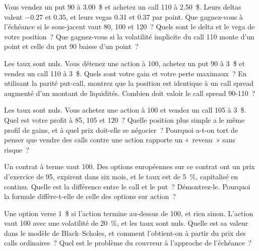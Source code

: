\begin{question}\label{iq:iv2:options-parity-and-greeks:27}
Vous vendez un put 90 à 3.00~\$ et achetez un call 110 à 2.50~\$. Leurs deltas valent $-0.27$ et $0.35$, et leurs vegas 0.31 et 0.37 par point. Que gagnez-vous à l'échéance si le sous-jacent vaut 80, 100 et 120~? Quels sont le delta et le vega de votre position~? Que gagnez-vous si la volatilité implicite du call 110 monte d'un point et celle du put 90 baisse d'un point~?
\end{question}

\begin{question}\label{iq:iv2:options-parity-and-greeks:28}
Les taux sont nuls. Vous détenez une action à 100, achetez un put 90 à 3~\$ et vendez un call 110 à 3~\$. Quels sont votre gain et votre perte maximaux~? En utilisant la parité put-call, montrez que la position est identique à un call spread augmenté d'un montant de liquidités. Combien doit valoir le call spread 90-110~?
\end{question}

\begin{question}\label{iq:iv2:options-parity-and-greeks:29}
Les taux sont nuls. Vous achetez une action à 100 et vendez un call 105 à 3~\$. Quel est votre profit à 85, 105 et 120~? Quelle position plus simple a le même profil de gains, et à quel prix doit-elle se négocier~? Pourquoi a-t-on tort de penser que vendre des calls contre une action rapporte un «~revenu~» sans risque~?
\end{question}

\begin{question}\label{iq:iv2:options-parity-and-greeks:30}
Un contrat à terme vaut 100. Des options européennes sur ce contrat ont un prix d'exercice de 95, expirent dans six mois, et le taux est de 5~\%, capitalisé en continu. Quelle est la différence entre le call et le put~? Démontrez-le. Pourquoi la formule diffère-t-elle de celle des options sur action~?
\end{question}

\begin{question}\label{iq:iv2:options-parity-and-greeks:31}
Une option verse 1~\$ si l'action termine au-dessus de 100, et rien sinon. L'action vaut 100 avec une volatilité de 20~\%, et les taux sont nuls. Quelle est sa valeur dans le modèle de Black--Scholes, et comment l'obtient-on à partir du prix des calls ordinaires~? Quel est le problème du couvreur à l'approche de l'échéance~?
\end{question}

